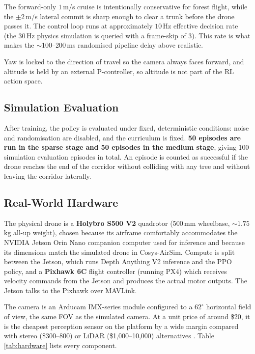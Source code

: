 \documentclass[../main.tex]{subfiles}
\begin{document}
The forward-only $1$\,m/s cruise is intentionally conservative for forest flight, while the $\pm 2$\,m/s lateral commit is sharp enough to clear a trunk before the drone passes it. The control loop runs at approximately $10$\,Hz effective decision rate (the $30$\,Hz physics simulation is queried with a frame-skip of 3). This rate is what makes the $\sim$100--200\,ms randomised pipeline delay above realistic.

Yaw is locked to the direction of travel so the camera always faces forward, and altitude is held by an external P-controller, so altitude is not part of the RL action space.

\subsection{Simulation Evaluation}

After training, the policy is evaluated under fixed, deterministic conditions: noise and randomisation are disabled, and the curriculum is fixed. \textbf{50 episodes are run in the sparse stage and 50 episodes in the medium stage}, giving 100 simulation evaluation episodes in total. An episode is counted as successful if the drone reaches the end of the corridor without colliding with any tree and without leaving the corridor laterally.

\subsection{Real-World Hardware}

The physical drone is a \textbf{Holybro S500 V2} quadrotor (500\,mm wheelbase, $\sim 1.75$\,kg all-up weight), chosen because its airframe comfortably accommodates the NVIDIA Jetson Orin Nano companion computer used for inference and because its dimensions match the simulated drone in Cosys-AirSim. Compute is split between the Jetson, which runs Depth Anything V2 inference and the PPO policy, and a \textbf{Pixhawk 6C} flight controller (running PX4) which receives velocity commands from the Jetson and produces the actual motor outputs. The Jetson talks to the Pixhawk over MAVLink.

The camera is an Arducam IMX-series module configured to a $62^{\circ}$ horizontal field of view, the same FOV as the simulated camera. At a unit price of around \$20, it is the cheapest perception sensor on the platform by a wide margin compared with stereo (\$300--800) or LiDAR (\$1{,}000--10{,}000) alternatives \cite{Butt2024,Hrabar2012}. Table \ref{tab:hardware} lists every component.
\end{document}
